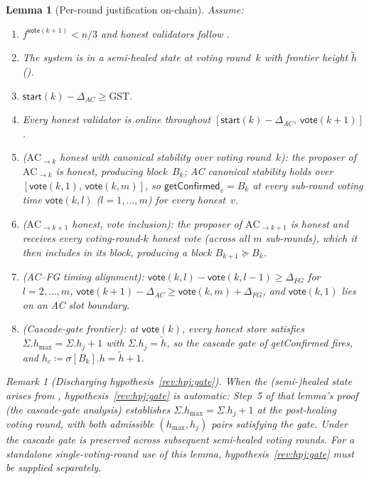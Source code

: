 \ifx\litemode\undefined\documentclass{article}\fi
\newcommand{\hmax}{\ensuremath{h_{\max}}\xspace}
\newcommand{\start}{\ensuremath{\mathsf{start}}}
\newcommand{\vote}{\ensuremath{\mathsf{vote}}}
\newcommand{\GST}{\ensuremath{\mathrm{GST}}\xspace}
\newcommand{\comm}[1]{\ensuremath{\widetilde{#1}}}
\newcommand{\getConfirmed}{\textsf{getConfirmed}\xspace}
\theoremstyle{plain}
\newtheorem{lemmaboth}[lemma]{Lemma}
\theoremstyle{definition}
\theoremstyle{remark}
\newtheorem{remark}[theorem]{Remark}
\begin{document}
\begin{lemmaboth}[Per-round justification on-chain]\label{lem:per-round-justification}
Assume:
\begin{enumerate}
  \item\label{rev:hpj:f} $f^{\vote(k+1)} < n/3$ and honest validators follow .
  \item\label{rev:hpj:healed} The system is in a semi-healed state at voting round~$k$ with frontier height $\comm{h}$ ().
  \item\label{rev:hpj:gst} $\start(k) - \Delta_{\mathit{AC}} \geq \GST$.
  \item\label{rev:hpj:online} Every honest validator is online throughout $[\start(k) - \Delta_{\mathit{AC}},\, \vote(k+1)]$.
  \item\label{rev:hpj:ack-honest} \emph{($\mathrm{AC}_{\to k}$ honest with canonical stability over voting round~$k$):} the proposer of $\mathrm{AC}_{\to k}$ is honest, producing block~$B_k$; AC canonical stability holds over $[\vote(k, 1),\, \vote(k, m)]$, so $\getConfirmed_v = B_k$ at every sub-round voting time $\vote(k, l)$ ($l = 1, \ldots, m$) for every honest~$v$.
  \item\label{rev:hpj:ack1-honest} \emph{($\mathrm{AC}_{\to k+1}$ honest, vote inclusion):} the proposer of $\mathrm{AC}_{\to k+1}$ is honest and receives every voting-round-$k$ honest vote (across all $m$ sub-rounds), which it then includes in its block, producing a block $B_{k+1} \succeq B_k$.
  \item\label{rev:hpj:align} \emph{(AC--FG timing alignment):} $\vote(k, l) - \vote(k, l-1) \geq \Delta_{\mathit{FG}}$ for $l = 2, \ldots, m$, $\vote(k+1) - \Delta_{\mathit{AC}} \geq \vote(k, m) + \Delta_{\mathit{FG}}$, and $\vote(k, 1)$ lies on an AC slot boundary.
  \item\label{rev:hpj:gate} \emph{(Cascade-gate frontier):} at $\vote(k)$, every honest store satisfies $\Sigma.\hmax = \Sigma.h_j + 1$ with $\Sigma.h_j = \comm{h}$, so the cascade gate of \getConfirmed{} fires, and $h_c \coloneqq \sigma[B_k].h = \comm{h} + 1$.
\end{enumerate}
\iffull
\begin{remark}[Discharging hypothesis~\ref{rev:hpj:gate}]
When the (semi-)healed state arises from , hypothesis~\ref{rev:hpj:gate} is automatic: Step~5 of that lemma's proof (the cascade-gate analysis) establishes $\Sigma.\hmax = \Sigma.h_j + 1$ at the post-healing voting round, with both admissible $(\hmax, h_j)$ pairs satisfying the gate. Under  the cascade gate is preserved across subsequent semi-healed voting rounds.
For a standalone single-voting-round use of this lemma, hypothesis~\ref{rev:hpj:gate} must be supplied separately.
\end{remark}


\end{lemmaboth}
\end{document}
